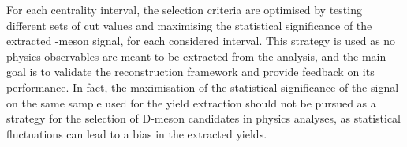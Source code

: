 For each centrality interval, the selection criteria are optimised by testing different sets of cut values and maximising the statistical significance of the extracted \ds-meson signal, for each considered \pt interval. This strategy is used as no physics observables are meant to be extracted from the analysis, and the main goal is to validate the reconstruction framework and provide feedback on its performance. In fact, the maximisation of the statistical significance of the signal on the same sample used for the yield extraction should not be pursued as a strategy for the selection of D-meson candidates in physics analyses, as statistical fluctuations can lead to a bias in the extracted yields. 
 
\begin{table}[htb]
    \centering
    \caption{Variation range and number of steps for the variables used in the optimisation of the selection criteria for the selection of \ds- and \dpl-meson candidates in Pb--Pb collisions at \fivenn.}
    \label{tab:selection_criteria_pbpb}
\end{table}

